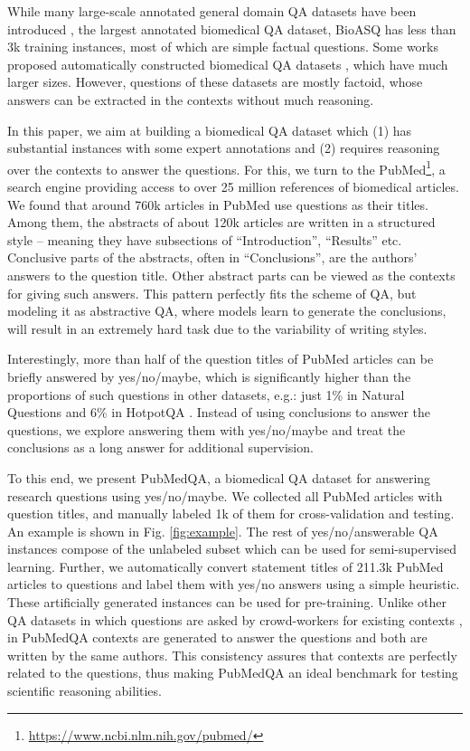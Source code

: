 \documentclass[11pt,a4paper]{article}
\begin{document}
While many large-scale annotated general domain QA datasets have been introduced \cite{rajpurkar2016squad, lai2017race, kovcisky2018narrativeqa, yang2018hotpotqa, kwiatkowski2019natural}, the largest annotated biomedical QA dataset, BioASQ \cite{tsatsaronis2015overview} has less than 3k training instances, most of which are simple factual questions. Some works proposed automatically constructed biomedical QA datasets \cite{pampari2018emrqa, pappas2018bioread, kim2018pilot}, which have much larger sizes. However, questions of these datasets are mostly factoid, whose answers can be extracted in the contexts without much reasoning.

In this paper, we aim at building a biomedical QA dataset which (1) has substantial instances with some expert annotations and (2) requires reasoning over the contexts to answer the questions. For this, we turn to the PubMed\footnote{\url{https://www.ncbi.nlm.nih.gov/pubmed/}}, a search engine providing access to over 25 million references of biomedical articles. We found that around 760k articles in PubMed use questions as their titles. Among them, the abstracts of about 120k articles are written in a structured style -- meaning they have subsections of ``Introduction'', ``Results'' etc. Conclusive parts of the abstracts, often in ``Conclusions'', are the authors' answers to the question title. Other abstract parts can be viewed as the contexts for giving such answers. This pattern perfectly fits the scheme of QA, but modeling it as abstractive QA, where models learn to generate the conclusions, will result in an extremely hard task due to the variability of writing styles.

Interestingly, more than half of the question titles of PubMed articles can be briefly answered by yes/no/maybe, which is significantly higher than the proportions of such questions in other datasets, e.g.: just 1\% in Natural Questions \cite{kwiatkowski2019natural} and 6\% in HotpotQA \cite{yang2018hotpotqa}. Instead of using conclusions to answer the questions, we explore answering them with yes/no/maybe and treat the conclusions as a long answer for additional supervision.

To this end, we present PubMedQA, a biomedical QA dataset for answering research questions using yes/no/maybe. We collected all PubMed articles with question titles, and manually labeled 1k of them for cross-validation and testing. An example is shown in Fig. \ref{fig:example}. The rest of yes/no/answerable QA instances compose of the unlabeled subset which can be used for semi-supervised learning. Further, we automatically convert statement titles of 211.3k PubMed articles to questions and label them with yes/no answers using a simple heuristic. These artificially generated instances can be used for pre-training. Unlike other QA datasets in which questions are asked by crowd-workers for existing contexts \cite{rajpurkar2016squad, yang2018hotpotqa, kovcisky2018narrativeqa}, in PubMedQA contexts are generated to answer the questions and both are written by the same authors. This consistency assures that contexts are perfectly related to the questions, thus making PubMedQA an ideal benchmark for testing scientific reasoning abilities.
\end{document}

